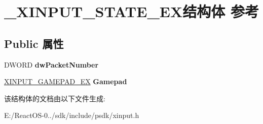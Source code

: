 \hypertarget{struct___x_i_n_p_u_t___s_t_a_t_e___e_x}{}\section{\+\_\+\+X\+I\+N\+P\+U\+T\+\_\+\+S\+T\+A\+T\+E\+\_\+\+E\+X结构体 参考}
\label{struct___x_i_n_p_u_t___s_t_a_t_e___e_x}
\subsection*{Public 属性}
\begin{DoxyCompactItemize}
\item 
\mbox{\label{struct___x_i_n_p_u_t___s_t_a_t_e___e_x_a83e34c078ca8f75ea410d69da039e391}} 
D\+W\+O\+RD {\bfseries dw\+Packet\+Number}
\item 
\mbox{\label{struct___x_i_n_p_u_t___s_t_a_t_e___e_x_a0312f8650a3e4587681f7378f296b9ff}} 
\hyperlink{struct___x_i_n_p_u_t___g_a_m_e_p_a_d___e_x}{X\+I\+N\+P\+U\+T\+\_\+\+G\+A\+M\+E\+P\+A\+D\+\_\+\+EX} {\bfseries Gamepad}
\end{DoxyCompactItemize}


该结构体的文档由以下文件生成\+:\begin{DoxyCompactItemize}
\item 
E\+:/\+React\+O\+S-\/0../sdk/include/psdk/xinput.\+h\end{DoxyCompactItemize}
